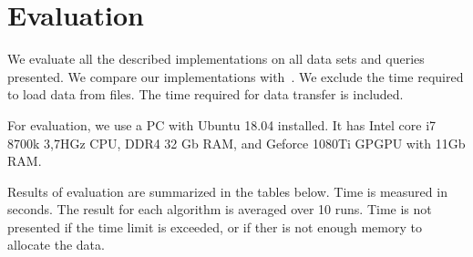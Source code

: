 \section{Evaluation}

We evaluate all the described implementations on all data sets and queries presented.
We compare our implementations with~\cite{Azimov:2018:CPQ:3210259.3210264}.
We exclude the time required to load data from files.
The time required for data transfer is included.

For evaluation, we use a PC with Ubuntu 18.04 installed.
It has Intel core i7 8700k 3,7HGz CPU, DDR4 32 Gb RAM, and Geforce 1080Ti GPGPU with 11Gb RAM.

Results of evaluation are summarized in the tables below.
Time is measured in seconds.
The result for each algorithm is averaged over 10 runs.
Time is not presented if the time limit is exceeded, or if ther is not enough memory to allocate the data.

